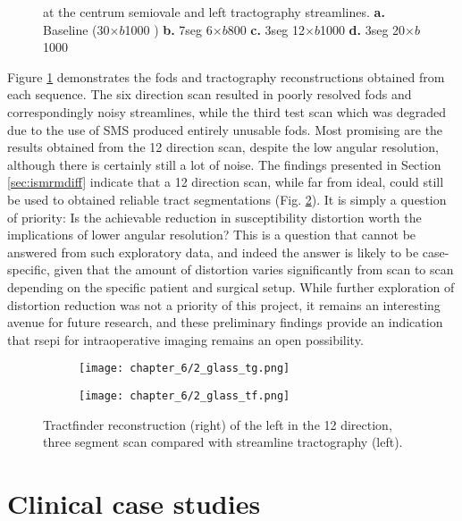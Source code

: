 \documentclass[12pt,phd,a4paper,twoside]{ucl_thesis}
\newcommand{\x}{\nobreak\hspace{.1em minus .045em}$\times$\nobreak\hspace{.1em minus .045em}}
\begin{document}
\begin{figure}[htb!]
  \centering
  
  \caption[RS-EPI test scan fibre orientation and CST reconstructions]{ at the centrum semiovale and left  tractography streamlines.
  \textbf{\sffamily a.} Baseline (30\x{}$b$1000  )
  \textbf{\sffamily b.} 7seg 6\x{}$b$800
  \textbf{\sffamily c.} 3seg 12\x{}$b$1000
  \textbf{\sffamily d.} 3seg 20\x{}$b$1000}
  \label{fig:rsepi-fod}
\end{figure}

Figure \ref{fig:rsepi-fod} demonstrates the \glspl{fod} and tractography reconstructions obtained from each sequence.
The six direction scan resulted in poorly resolved \glspl{fod} and correspondingly noisy streamlines, while the third test scan which was degraded due to the use of SMS produced entirely unusable \glspl{fod}.
Most promising are the results obtained from the 12 direction scan, despite the low angular resolution, although there is certainly still a lot of noise.
The findings presented in Section \ref{sec:ismrmdiff} indicate that a 12 direction scan, while far from ideal, could still be used to obtained reliable tract segmentations (Fig. \ref{fig:ssepi2}).
It is simply a question of priority:
Is the achievable reduction in susceptibility distortion worth the implications of lower angular resolution?
This is a question that cannot be answered from such exploratory data, and indeed the answer is likely to be case-specific, given that the amount of distortion varies significantly from scan to scan depending on the specific patient and surgical setup.
While further exploration of distortion reduction was not a priority of this project, it remains an interesting avenue for future research, and these preliminary findings provide an indication that \gls{rsepi} for intraoperative imaging remains an open possibility.

\begin{figure}[hbt!]
  \centering
  \begin{subfigure}{0.4\textwidth}
    \texttt{[image: chapter\_6/2\_glass\_tg.png]}
  \end{subfigure}\begin{subfigure}{0.4\textwidth}
    \texttt{[image: chapter\_6/2\_glass\_tf.png]}
  \end{subfigure}
  \caption[RS-EPI 12 direction test scan CST reconstructions with tractography and tractfinder]{Tractfinder reconstruction (right) of the left  in the 12 direction, three segment  scan compared with streamline tractography (left).}
  \label{fig:ssepi2}
\end{figure}
\clearpage{}
\clearpage{}\section{Clinical case studies}
\end{document}
